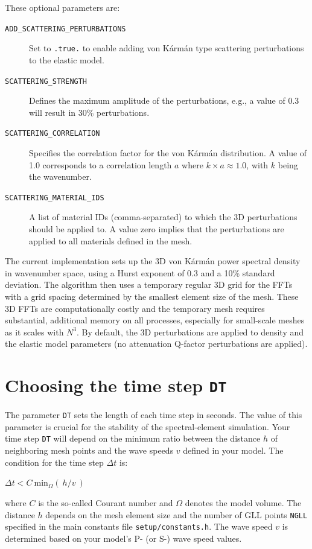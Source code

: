 These optional parameters are:
\begin{description}
\item [{\texttt{ADD\_SCATTERING\_PERTURBATIONS}}] Set to \texttt{.true.} to enable adding von K\'arm\'an type scattering perturbations to the elastic model.
\item [{\texttt{SCATTERING\_STRENGTH}}] Defines the maximum amplitude of the perturbations, e.g., a value of 0.3 will result in 30\% perturbations.
\item [{\texttt{SCATTERING\_CORRELATION}}] Specifies the correlation factor for the von K\'arm\'an distribution. A value of 1.0 corresponds to a correlation length $a$ where $k \times a \approx 1.0$, with $k$ being the wavenumber.
\item [{\texttt{SCATTERING\_MATERIAL\_IDS}}] A list of material IDs (comma-separated) to which the 3D perturbations should be applied to. A value zero implies that the perturbations are applied to all materials defined in the mesh.

\end{description}

The current implementation sets up the 3D von K\'arm\'an power spectral density in wavenumber space, using a Hurst exponent of 0.3 and a 10\% standard deviation. The algorithm then uses a temporary regular 3D grid for the FFTs with a grid spacing determined by the smallest element size of the mesh. These 3D FFTs are computationally costly and the temporary mesh requires substantial, additional memory on all processes, especially for small-scale meshes as it scales with $N^3$. By default, the 3D perturbations are applied to density and the elastic model parameters (no attenuation Q-factor perturbations are applied).


\section{Choosing the time step \texttt{DT}}\label{sec:Choosing-the-Time-Step}

The parameter \texttt{DT} sets the length of each time step in seconds.
The value of this parameter is crucial for the stability of the spectral-element
simulation. Your time step \texttt{DT} will depend on the minimum
ratio between the distance $h$ of neighboring mesh points and the
wave speeds $v$ defined in your model. The condition for the time
step $\Delta t$ is:
\begin{lyxcode}
$\Delta t<C~\mathrm{min}_{\Omega}(~h/v~)$
\end{lyxcode}
where $C$ is the so-called Courant number and $\Omega$ denotes the
model volume. The distance $h$ depends on the mesh element size and
the number of GLL points \texttt{NGLL} specified in the main constants
file \texttt{setup/constants.h}. The wave speed $v$ is determined based on your model's P- (or S-)
wave speed values.\newline



